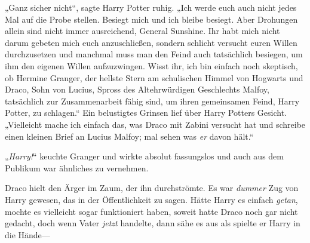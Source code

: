 „Ganz sicher nicht“, sagte Harry Potter ruhig. „Ich werde euch auch nicht jedes Mal auf die Probe stellen. Besiegt mich und ich bleibe besiegt. Aber Drohungen allein sind nicht immer ausreichend, General Sunshine. Ihr habt mich nicht darum gebeten mich euch anzuschließen, sondern schlicht versucht euren Willen durchzusetzen und manchmal muss man den Feind auch tatsächlich besiegen, um ihm den eigenen Willen aufzuzwingen. Wisst ihr, ich bin einfach noch skeptisch, ob Hermine Granger, der hellste Stern am schulischen Himmel von Hogwarts und Draco, Sohn von Lucius, Spross des Altehrwürdigen Geschlechts Malfoy, tatsächlich zur Zusammenarbeit fähig sind, um ihren gemeinsamen Feind, Harry Potter, zu schlagen.“ Ein belustigtes Grinsen lief über Harry Potters Gesicht. „Vielleicht mache ich einfach das, was Draco mit Zabini versucht hat und schreibe einen kleinen Brief an Lucius Malfoy; mal sehen was \emph{er} davon hält.“

„\emph{Harry!}“ keuchte Granger und wirkte absolut fassungslos und auch aus dem Publikum war ähnliches zu vernehmen.

Draco hielt den Ärger im Zaum, der ihn durchströmte. Es war \emph{dummer} Zug von Harry gewesen, das in der Öffentlichkeit zu sagen. Hätte Harry es einfach \emph{getan}, mochte es vielleicht sogar funktioniert haben, soweit hatte Draco noch gar nicht gedacht, doch wenn Vater \emph{jetzt} handelte, dann sähe es aus als spielte er Harry in die Hände—

